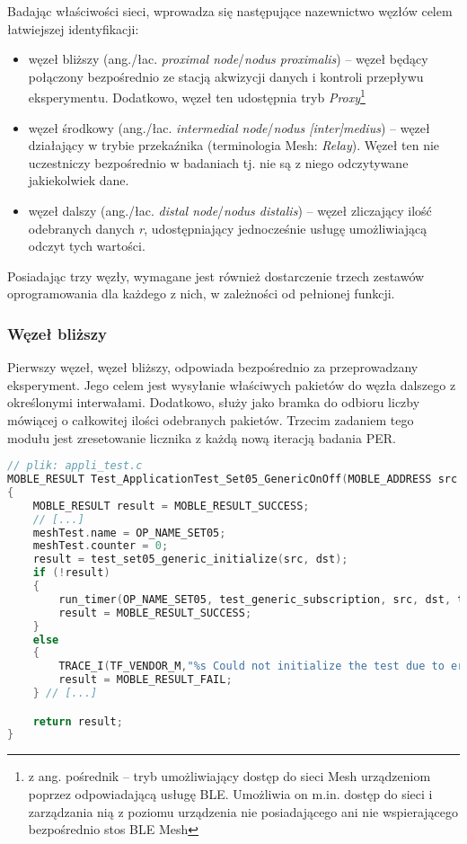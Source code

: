 Badając właściwości sieci, wprowadza się następujące nazewnictwo węzłów celem łatwiejszej identyfikacji:
\begin{itemize}\label{node-naming-convention}
	\item węzeł bliższy (ang./łac. \textit{proximal node}/\textit{nodus proximalis}) -- węzeł będący połączony bezpośrednio
	ze stacją akwizycji danych i kontroli przepływu eksperymentu. Dodatkowo, węzeł ten udostępnia tryb \textit{Proxy}\footnote{z ang. pośrednik -- tryb umożliwiający dostęp do sieci Mesh urządzeniom poprzez odpowiadającą usługę BLE. Umożliwia
	on m.in. dostęp do sieci i zarządzania nią z poziomu urządzenia nie posiadającego ani nie wspierającego bezpośrednio stos BLE Mesh}
	\item węzeł środkowy (ang./łac. \textit{intermedial node}/\textit{nodus [inter]medius}) -- węzeł działający w trybie
	przekaźnika (terminologia Mesh: \textit{Relay}). Węzeł ten nie uczestniczy bezpośrednio w badaniach tj. nie są
	z niego odczytywane jakiekolwiek dane.
	\item węzeł dalszy (ang./łac. \textit{distal node}/\textit{nodus distalis}) -- węzeł zliczający ilość odebranych danych \textit{r},
	udostępniający jednocześnie usługę umożliwiającą odczyt tych wartości. 
\end{itemize}

Posiadając trzy węzły, wymagane jest również dostarczenie trzech zestawów oprogramowania dla każdego z nich, w zależności
od pełnionej funkcji.

\subsubsection{Węzeł bliższy}\label{sec:proximal-node}
Pierwszy węzeł, węzeł bliższy, odpowiada bezpośrednio za przeprowadzany eksperyment. Jego celem jest wysyłanie właściwych
pakietów do węzła dalszego z określonymi interwałami. Dodatkowo, służy jako bramka do odbioru liczby mówiącej
o całkowitej ilości odebranych pakietów. Trzecim zadaniem tego modułu jest zresetowanie licznika z każdą nową iteracją
badania PER.

\begin{lstlisting}[language=C,
    caption={Kod uruchamiający sekwencję badawczą PER},
    label={lst:code_generic_onoff}]
// plik: appli_test.c
MOBLE_RESULT Test_ApplicationTest_Set05_GenericOnOff(MOBLE_ADDRESS src ,MOBLE_ADDRESS dst)
{
	MOBLE_RESULT result = MOBLE_RESULT_SUCCESS;
	// [...]
	meshTest.name = OP_NAME_SET05;
	meshTest.counter = 0;
	result = test_set05_generic_initialize(src, dst);
	if (!result)
	{
		run_timer(OP_NAME_SET05, test_generic_subscription, src, dst, test_set05_generic);
		result = MOBLE_RESULT_SUCCESS;
	}
	else
	{
		TRACE_I(TF_VENDOR_M,"%s Could not initialize the test due to error code=%d \r\n", OP_NAME_SET05, result);
		result = MOBLE_RESULT_FAIL;
	} // [...]

	return result;
}
\end{lstlisting}

